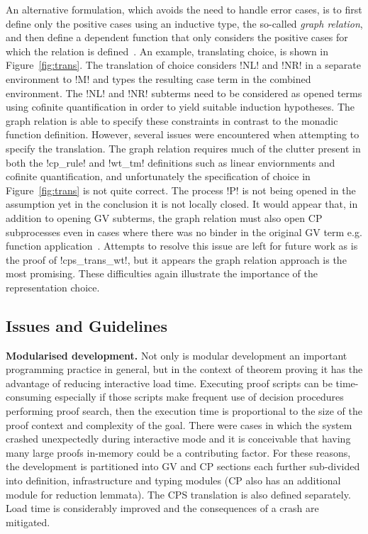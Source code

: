 An alternative formulation, which avoids the need to handle error cases, is to
first define only the positive cases using an inductive type, the so-called
\textit{graph relation}, and then define a dependent function that only
considers the positive cases for which the relation is
defined~\cite{McKinna:2009}. An example, translating choice, is shown in
Figure~\ref{fig:trans}. The translation of choice considers \coqe!NL! and
\coqe!NR! in a separate environment to \coqe!M! and types the resulting case
term in the combined environment. The \coqe!NL! and \coqe!NR! subterms need to
be considered as opened terms using cofinite quantification in order to yield
suitable induction hypotheses. The graph relation is able to specify these
constraints in contrast to the monadic function definition. However, several
issues were encountered when attempting to specify the translation. The graph
relation requires much of the clutter present in both the \coqe!cp_rule! and
\coqe!wt_tm! definitions such as linear enviornments and cofinite
quantification, and unfortunately the specification of choice in
Figure~\ref{fig:trans} is not quite correct. The process \coqe!P! is not being
opened in the  assumption yet in the conclusion it is not locally
closed. It would appear that, in addition to opening GV subterms, the graph
relation must also open CP subprocesses even in cases where there was no
binder in the original GV term e.g. function
application~\cite{Wadler:2014}. Attempts to resolve this issue are left for
future work as is the proof of \coqe!cps_trans_wt!, but it appears the graph
relation approach is the most promising. These difficulties again illustrate
the importance of the representation choice.

\subsection{Issues and Guidelines}

\textbf{Modularised development.} Not only is modular development an important
programming practice in general, but in the context of theorem proving it has
the advantage of reducing interactive load time. Executing proof scripts can
be time-consuming especially if those scripts make frequent use of decision
procedures performing proof search, then the execution time is proportional to
the size of the proof context and complexity of the goal. There were cases in
which the system crashed unexpectedly during interactive mode and it is
conceivable that having many large proofs in-memory could be a contributing
factor. For these reasons, the development is partitioned into GV and CP
sections each further sub-divided into definition, infrastructure and typing
modules (CP also has an additional module for reduction lemmata). The CPS
translation is also defined separately. Load time is considerably improved and
the consequences of a crash are mitigated.

